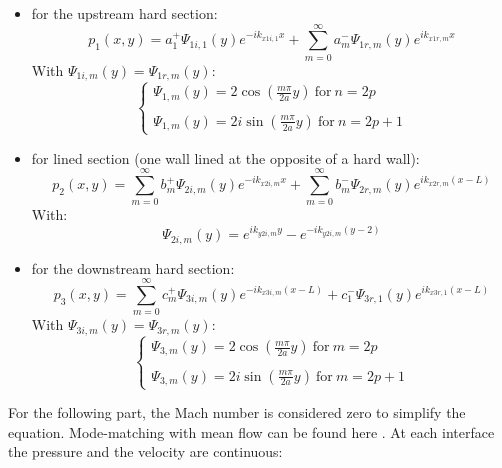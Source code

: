 \begin{itemize}
    \item for the upstream hard section:
    \begin{equation}
        p_1(x,y)=a_1^+ \Psi_{1i,1}(y)e^{-ik_{x1i,1}x}+\sum_{m=0}^\infty a_m^- \Psi_{1r,m}(y)e^{ik_{x1r,m}x}
    \end{equation}
    With $\Psi_{1i,m}(y)=\Psi_{1r,m}(y)$: 
    \begin{equation}
        \left\{
        \begin{array}{ll}
         \Psi_{1,m}(y)=2\cos(\frac{m\pi}{2a}y)\ \text{for} \ n=2p \\
        \\
        \Psi_{1,m}(y)=2i\sin(\frac{m\pi}{2a}y) \ \text{for} \ n=2p+1
       \end{array}
       \right.
    \end{equation}
    \item for lined section (one wall lined at the opposite of a hard wall):
    \begin{equation}
        p_2(x,y)=\sum_{m=0}^\infty b_m^+ \Psi_{2i,m}(y)e^{-ik_{x2i,m}x}+\sum_{m=0}^\infty b_m^- \Psi_{2r,m}(y)e^{ik_{x2r,m}(x-L)}
    \end{equation}
    With: 
    \begin{equation}
        \Psi_{2i,m}(y)=e^{ik_{y2i,m}y}-e^{-ik_{y2i,m}(y-2)}
    \end{equation}
    \item for the downstream hard section:
    \begin{equation}
        p_3(x,y)=\sum_{m=0}^\infty c_m^+ \Psi_{3i,m}(y)e^{-ik_{x3i,m}(x-L)}+c_1^- \Psi_{3r,1}(y)e^{ik_{x3r,1}(x-L)}
    \end{equation}
    With $\Psi_{3i,m}(y)=\Psi_{3r,m}(y)$:   
    \begin{equation}
        \left\{
        \begin{array}{ll}
         \Psi_{3,m}(y)=2\cos(\frac{m\pi}{2a}y)\ \text{for} \ m=2p \\
        \\
        \Psi_{3,m}(y)=2i\sin(\frac{m\pi}{2a}y) \ \text{for} \ m=2p+1
       \end{array}
       \right.
    \end{equation}
\end{itemize}
For the following part, the Mach number is considered zero to simplify the equation. Mode-matching with mean flow can be found here \cite{ModematchM}.
At each interface the pressure and the velocity are continuous:
